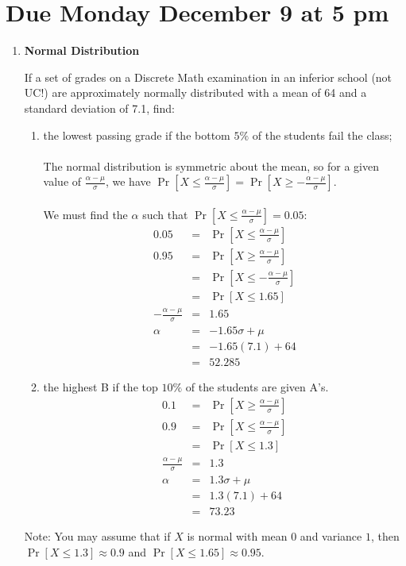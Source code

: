 \documentclass[11pt,fleqn]{article}
\begin{document}
\maketitle
\section*{Due Monday December 9 at 5 pm}

\begin{enumerate}

\item {\bf Normal Distribution}

If a set of grades on a Discrete Math examination in an inferior school
(not UC!) are approximately normally distributed with a mean of 64 and a
standard deviation of 7.1, find:
\begin{enumerate}
\item the lowest passing grade if the bottom $5\%$ of the
students fail the class; \\\\
The normal distribution is symmetric about the mean, so for a given value of $\frac{\alpha-\mu}{\sigma}$, we have $\Pr[X \leq \frac{\alpha-\mu}{\sigma}] = \Pr[X \geq -\frac{\alpha-\mu}{\sigma}]$. \\\\
We must find the $\alpha$ such that $\Pr[X \leq \frac{\alpha-\mu}{\sigma}] = 0.05$:
\begin{eqnarray*}
0.05 &=& \Pr[X \leq \frac{\alpha-\mu}{\sigma}] \\
0.95 &=& \Pr[X \geq \frac{\alpha-\mu}{\sigma}] \\
&=& \Pr[X \leq -\frac{\alpha-\mu}{\sigma}] \\
&=& \Pr[X \leq 1.65] \\
-\frac{\alpha-\mu}{\sigma} &=& 1.65 \\
\alpha &=& -1.65\sigma + \mu \\
&=& -1.65(7.1)+64 \\
&=& 52.285
\end{eqnarray*}
\item the highest B if the top $10\%$ of the students are given A's.
\begin{eqnarray*}
0.1 &=& \Pr[X \geq \frac{\alpha-\mu}{\sigma}] \\
0.9 &=& \Pr[X \leq \frac{\alpha-\mu}{\sigma}] \\
&=& \Pr[X \leq 1.3] \\
\frac{\alpha-\mu}{\sigma} &=& 1.3 \\
\alpha &=& 1.3\sigma + \mu \\
&=& 1.3(7.1)+64 \\
&=& 73.23
\end{eqnarray*}
\end{enumerate}
{\sc Note}: You may assume that if $X$ is normal with mean $0$ and
variance $1$, then $\Pr[X \leq 1.3] \approx 0.9$ and $\Pr[X \leq 1.65] \approx 0.95$.


\end{enumerate}
\end{document}
